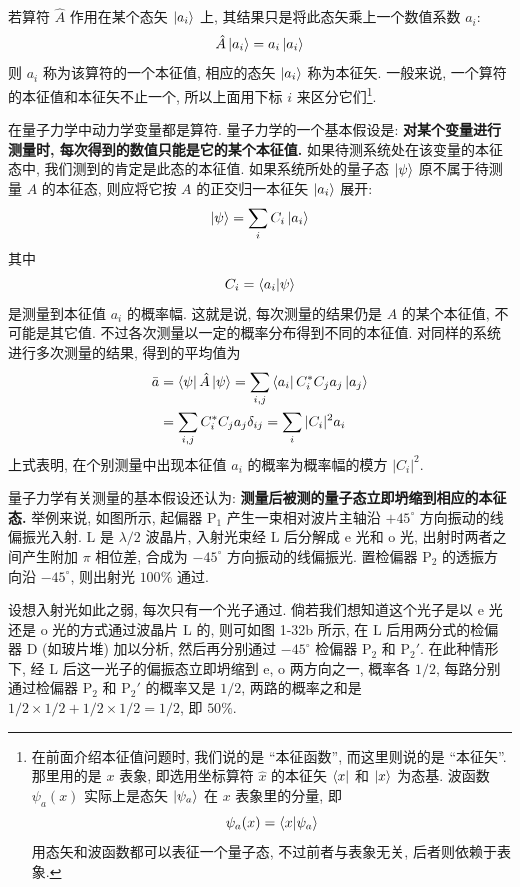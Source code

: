 若算符 $\hat{A}$ 作用在某个态矢 $\ket{a_i}$ 上, 其结果只是将此态矢乘上一个数值系数 $a_i$:
\[
\hat{A} \ket{a_i} = a_i \ket{a_i}
\]
则 $a_i$ 称为该算符的一个本征值, 相应的态矢 $\ket{a_i}$ 称为本征矢. 一般来说, 一个算符的本征值和本征矢不止一个, 所以上面用下标 $i$ 来区分它们\footnote{在前面介绍本征值问题时, 我们说的是 ``本征函数'', 而这里则说的是 ``本征矢''. 那里用的是 $x$ 表象, 即选用坐标算符 $\hat{x}$ 的本征矢 $\bra{x}$ 和 $\ket{x}$ 为态基. 波函数 $\psi_a(x)$ 实际上是态矢 $\ket{\psi_a}$ 在 $x$ 表象里的分量, 即
\[
\psi_a(x) = \bra{x}\ket{\psi_a}
\]
用态矢和波函数都可以表征一个量子态, 不过前者与表象无关, 后者则依赖于表象. }.

在量子力学中动力学变量都是算符. 量子力学的一个基本假设是: \textbf{对某个变量进行测量时, 每次得到的数值只能是它的某个本征值. }如果待测系统处在该变量的本征态中, 我们测到的肯定是此态的本征值. 如果系统所处的量子态 $\ket{\psi}$ 原不属于待测量 $A$ 的本征态, 则应将它按 $A$ 的正交归一本征矢 $\ket{a_i}$ 展开:
\[
\ket{\psi} = \sum_i C_i \ket{a_i}
\]
其中
\[
C_i = \bra{a_i}\ket{\psi}
\]
是测量到本征值 $a_i$ 的概率幅. 这就是说, 每次测量的结果仍是 $A$ 的某个本征值, 不可能是其它值. 不过各次测量以一定的概率分布得到不同的本征值. 对同样的系统进行多次测量的结果, 得到的平均值为
\begin{align*}
\bar{a} &= \bra{\psi} \hat{A} \ket{\psi} = \sum_{i, j} \bra{a_i} C_i^* C_j a_j \ket{a_j} \\
&= \sum_{i, j} C_i^* C_j a_j \delta_{ij} = \sum_i |C_i|^2 a_i
\end{align*}
上式表明, 在个别测量中出现本征值 $a_i$ 的概率为概率幅的模方 $|C_i|^2$.

量子力学有关测量的基本假设还认为: \textbf{测量后被测的量子态立即坍缩到相应的本征态. }举例来说, 如图所示, 起偏器 $\text{P}_1$ 产生一束相对波片主轴沿 $+45^\circ$ 方向振动的线偏振光入射. $\text{L}$ 是 $\lambda/2$ 波晶片, 入射光束经 $\text{L}$ 后分解成 $\text{e}$ 光和 $\text{o}$ 光, 出射时两者之间产生附加 $\pi$ 相位差, 合成为 $-45^\circ$ 方向振动的线偏振光. 置检偏器 $\text{P}_2$ 的透振方向沿 $-45^\circ$, 则出射光 $100\%$ 通过.


设想入射光如此之弱, 每次只有一个光子通过. 倘若我们想知道这个光子是以 $\text{e}$ 光还是 $\text{o}$ 光的方式通过波晶片 $\text{L}$ 的, 则可如图 1-32b 所示, 在 $\text{L}$ 后用两分式的检偏器 $\text{D}$ (如玻片堆) 加以分析, 然后再分别通过 $-45^\circ$ 检偏器 $\text{P}_2$ 和 $\text{P}_2'$. 在此种情形下, 经 $\text{L}$ 后这一光子的偏振态立即坍缩到 $\text{e}$, $\text{o}$ 两方向之一, 概率各 $1/2$, 每路分别通过检偏器 $\text{P}_2$ 和 $\text{P}_2'$ 的概率又是 $1/2$, 两路的概率之和是 $1/2 \times 1/2 + 1/2 \times 1/2 = 1/2$, 即 $50\%$.

